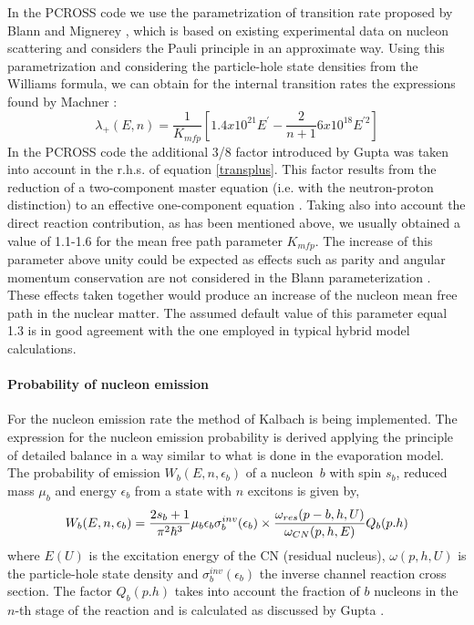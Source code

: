In the PCROSS code we use the parametrization of transition rate proposed by
Blann and Mignerey \cite{blmi72}, which is based on existing experimental
data on nucleon scattering and considers the Pauli principle in an
approximate way. Using this parametrization and considering the
particle-hole state densities from the Williams formula, we can obtain for
the internal transition rates the expressions found by Machner \cite{ma81}: 
\begin{equation}
\lambda _{+}(E,n)=\frac{1}{K_{mfp}}\left[ 1.4x10^{21}E^{\prime }-\frac{2}{n+1%
}6x10^{18}E^{\prime 2}\right]  \label{transplus}
\end{equation}%
In the PCROSS code the additional 3/8 factor introduced by Gupta \cite{gu81}
was taken into account in the r.h.s. of equation \ref{transplus}. This
factor results from the reduction of a two-component master equation (i.e.
with the neutron-proton distinction) to an effective one-component equation 
\cite{gu81}. Taking also into account the direct reaction contribution, as
has been mentioned above, we usually obtained a value of 1.1-1.6 for the
mean free path parameter $K_{mfp}$. The increase of this parameter above
unity could be expected as effects such as parity and angular momentum
conservation are not considered in the Blann parameterization \cite{blmi72}.
These effects taken together would produce an increase of the nucleon mean
free path in the nuclear matter. The assumed default value of this parameter
equal 1.3 is in good agreement with the one employed in typical hybrid model
calculations.

\paragraph{Probability of nucleon emission}

For the nucleon emission rate the method of Kalbach \cite{clbl71,cl72,ka77}
is being implemented. The expression for the nucleon emission probability is
derived applying the principle of detailed balance in a way similar to what
is done in the evaporation model. The probability of emission $%
W_{b}(E,n,\epsilon _{b})$ of a nucleon\textit{\ }$b$ with spin $s_{b}$,
reduced mass $\mu _{b}$ and energy $\epsilon _{b}$ from a state with $n$
excitons is given by, 
\begin{equation}
W_{b}(E,n,\epsilon _{b})=\frac{2s_{b}+1}{\pi ^{2}\hbar ^{3}}\mu _{b}\epsilon
_{b}\sigma _{b}^{inv}(\epsilon _{b})\times   \notag \\
\frac{\omega _{res}(p-b,h,U)}{\omega _{CN}(p,h,E)}Q_{b}(p.h)
\end{equation}%
where $E(U)$ is the excitation energy of the CN (residual nucleus), $\omega
(p,h,U)$ is the particle-hole state density and $\sigma _{b}^{inv}(\epsilon
_{b})$ the inverse channel reaction cross section. The factor $Q_{b}(p.h)$
takes into account the fraction of $b$ nucleons in the $n$-th stage of the
reaction and is calculated as discussed by Gupta \cite{gu81}.


